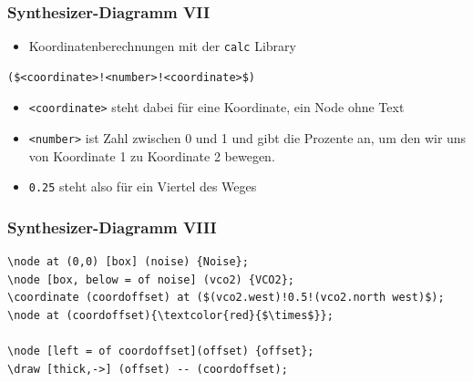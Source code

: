 \documentclass[14pt,ngerman]{beamer}
\begin{document}
\begin{frame}[containsverbatim]
\frametitle{Synthesizer-Diagramm VII}

\begin{itemize}
\item Koordinatenberechnungen mit der \texttt{calc} Library
\end{itemize}

\begin{lstlisting}
($<coordinate>!<number>!<coordinate>$)
\end{lstlisting}

\begin{itemize}
	\item \texttt{<coordinate>} steht dabei für eine Koordinate, ein Node ohne Text
	\item  \texttt{<number>} ist Zahl zwischen 0 und 1 und gibt die Prozente an, um den wir uns von Koordinate 1 zu Koordinate 2 bewegen. 
	\item  \texttt{0.25} steht also für ein Viertel des Weges 
\end{itemize}

\end{frame}

\begin{frame}[containsverbatim]
\frametitle{Synthesizer-Diagramm VIII}


\begin{lstlisting}
\node at (0,0) [box] (noise) {Noise};
\node [box, below = of noise] (vco2) {VCO2};
\coordinate (coordoffset) at ($(vco2.west)!0.5!(vco2.north west)$);
\node at (coordoffset){\textcolor{red}{$\times$}};

\node [left = of coordoffset](offset) {offset};
\draw [thick,->] (offset) -- (coordoffset);
\end{lstlisting}

\begin{center}
\end{center}

\end{frame}
\end{document}
